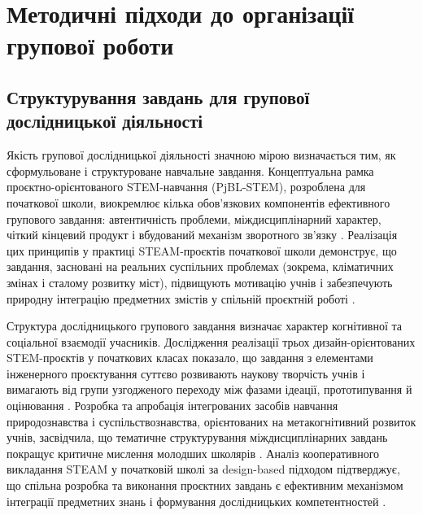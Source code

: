 \documentclass[a4paper,12pt]{article}
\begin{document}
\newpage


\section{Методичні підходи до організації групової роботи}

\subsection{Структурування завдань для групової дослідницької діяльності}

Якість групової дослідницької діяльності значною мірою визначається тим, як сформульоване і структуроване навчальне завдання. Концептуальна рамка проєктно-орієнтованого STEM-навчання (PjBL-STEM), розроблена для початкової школи, виокремлює кілька обов'язкових компонентів ефективного групового завдання: автентичність проблеми, міждисциплінарний характер, чіткий кінцевий продукт і вбудований механізм зворотного зв'язку \parencite{Retno2025579}. Реалізація цих принципів у практиці STEAM-проєктів початкової школи демонструє, що завдання, засновані на реальних суспільних проблемах (зокрема, кліматичних змінах і сталому розвитку міст), підвищують мотивацію учнів і забезпечують природну інтеграцію предметних змістів у спільній проєктній роботі \parencite{Vicente20201}.

Структура дослідницького групового завдання визначає характер когнітивної та соціальної взаємодії учасників. Дослідження реалізації трьох дизайн-орієнтованих STEM-проєктів у початкових класах показало, що завдання з елементами інженерного проєктування суттєво розвивають наукову творчість учнів і вимагають від групи узгодженого переходу між фазами ідеації, прототипування й оцінювання \parencite{Zhang2025568}. Розробка та апробація інтегрованих засобів навчання природознавства і суспільствознавства, орієнтованих на метакогнітивний розвиток учнів, засвідчила, що тематичне структурування міждисциплінарних завдань покращує критичне мислення молодших школярів \parencite{Sururuddin2026}. Аналіз кооперативного викладання STEAM у початковій школі за design-based підходом підтверджує, що спільна розробка та виконання проєктних завдань є ефективним механізмом інтеграції предметних знань і формування дослідницьких компетентностей \parencite{Li2022}.
\end{document}
